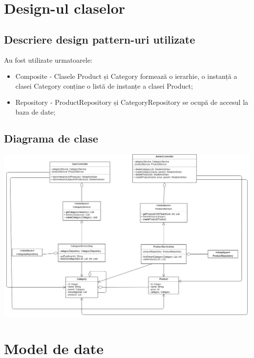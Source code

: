 \documentclass[11pt,a4paper,twoside,notitlepage]{article}
\begin{document}
\section{Design-ul claselor}

\subsection{Descriere design pattern-uri utilizate}

Au fost utilizate urmatoarele:
\begin{itemize}
	\item Composite - Clasele Product și Category formează o ierarhie, o instanță a clasei Category conține o listă de instanțe a clasei Product;
	\item Repository - ProductRepository și CategoryRepository se ocupă de accesul la baza de date;
\end{itemize}

\newpage
\subsection{Diagrama de clase}
\includegraphics[height=.5\textheight, width=1\textwidth]{class}
\newpage

\section{Model de date}
\end{document}
